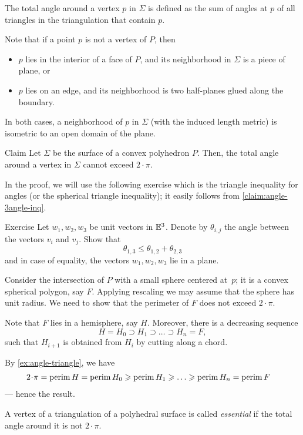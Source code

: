The total angle around a vertex $p$ in $\Sigma$ is defined as the sum of angles at $p$ of all triangles in the triangulation that contain $p$.

Note that if a point $p$ is not a vertex of $P$,
then
\begin{itemize}
\item $p$ lies in the interior of a face of $P$, and its neighborhood in $\Sigma$ is a piece of plane, or
\item $p$ lies on an edge, and its neighborhood is two half-planes glued along the boundary.
\end{itemize}
In both cases, a neighborhood of $p$ in $\Sigma$ (with the induced length metric) is isometric to an open domain of the plane.

\begin{thm}{Claim}\label{clm:total-angle}
Let $\Sigma$ be the surface of a convex polyhedron $P$.
Then, the total angle around a vertex in $\Sigma$ cannot exceed $2\cdot\pi$.
\end{thm} 


In the proof, we will use the following exercise which is the triangle inequality for angles (or the spherical triangle inequality); it easily follows from \ref{claim:angle-3angle-inq}.

\begin{thm}{Exercise}\label{ex:angle-triangle}
Let $w_1,w_2,w_3$ be unit vectors in $\mathbb{E}^3$.
Denote by $\theta_{i,j}$ the angle between the vectors $v_i$ and $v_j$.
Show that
$$\theta_{1,3}\le \theta_{1,2}+\theta_{2,3}$$
and in case of equality, the vectors $w_1,w_2,w_3$ lie in a plane.
\end{thm}

Consider the intersection of $P$ with a small sphere centered at~$p$;
it is a convex spherical polygon, say $F$.
Applying rescaling we may assume that the sphere has unit radius.
We need to show that the perimeter of $F$ does not exceed $2\cdot\pi$.

Note that $F$ lies in a hemisphere, say $H$.
Moreover, there is a decreasing sequence 
\[H=H_0\supset H_1\supset\dots\supset H_n=F,\]
such that $H_{i+1}$ is obtained from $H_{i}$ by cutting along a chord.

By \ref{ex:angle-triangle}, we have
\begin{align*}
2\cdot\pi=\perim H=\perim H_0&\ge\perim H_1\ge\dots\ge\perim H_n=\perim F
\end{align*}
--- hence the result.
\qedsf

A vertex of a triangulation of a polyhedral surface is called \emph{essential} if the total angle around it is not $2\cdot\pi$.

